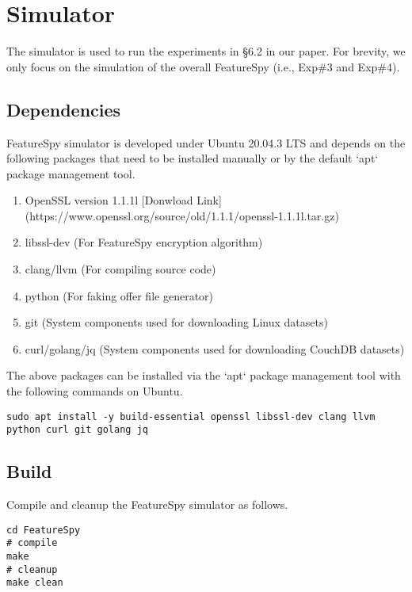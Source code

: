 \section{\sysnameF Simulator}

The simulator is used to run the experiments in §6.2 in our paper. For brevity, we only focus on the simulation of the overall FeatureSpy (i.e., Exp\#3 and Exp\#4).

\subsection{Dependencies}

FeatureSpy simulator is developed under Ubuntu 20.04.3 LTS and depends on the following packages that need to be installed manually or by the default `apt` package management tool.
\begin{enumerate}[leftmargin=*]
    \item OpenSSL version 1.1.1l [Donwload Link](https://www.openssl.org/source/old/1.1.1/openssl-1.1.1l.tar.gz)
    \item libssl-dev (For FeatureSpy encryption algorithm)
    \item clang/llvm (For compiling source code)
    \item python (For faking offer file generator)
    \item git (System components used for downloading Linux datasets)
    \item curl/golang/jq (System components used for downloading CouchDB datasets)
\end{enumerate}


The above packages can be installed via the `apt` package management tool with the following commands on Ubuntu.

\begin{lstlisting}[style=shell]
sudo apt install -y build-essential openssl libssl-dev clang llvm python curl git golang jq
\end{lstlisting}

\subsection{Build}

Compile and cleanup the FeatureSpy simulator as follows.

\begin{lstlisting}[style=shell]
cd FeatureSpy
# compile
make
# cleanup
make clean
\end{lstlisting}

